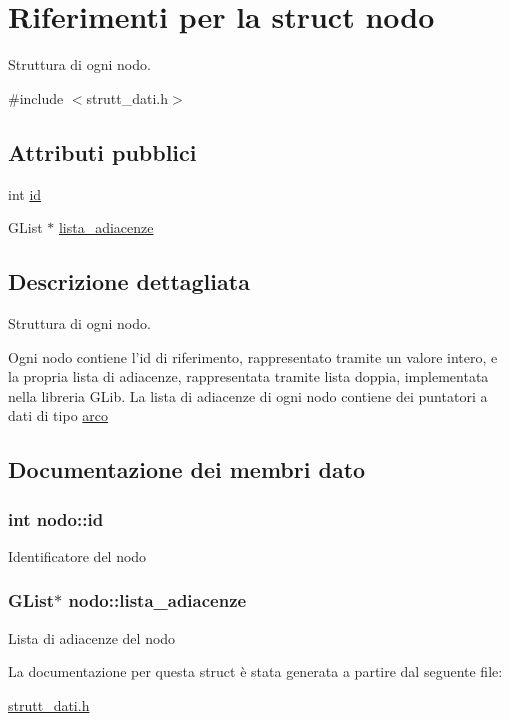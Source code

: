 \hypertarget{structnodo}{\section{Riferimenti per la struct nodo}
\label{structnodo}
}


Struttura di ogni nodo.  




{\ttfamily \#include $<$strutt\-\_\-dati.\-h$>$}

\subsection*{Attributi pubblici}
\begin{DoxyCompactItemize}
\item 
int \hyperlink{structnodo_ab666271a6c7a11224dff5d682f5b0473}{id}
\item 
G\-List $\ast$ \hyperlink{structnodo_a94b362e3d649f0289bbd3200d127e269}{lista\-\_\-adiacenze}
\end{DoxyCompactItemize}


\subsection{Descrizione dettagliata}
Struttura di ogni nodo. 

Ogni nodo contiene l'id di riferimento, rappresentato tramite un valore intero, e la propria lista di adiacenze, rappresentata tramite lista doppia, implementata nella libreria G\-Lib. La lista di adiacenze di ogni nodo contiene dei puntatori a dati di tipo \hyperlink{structarco}{arco} 

\subsection{Documentazione dei membri dato}
\hypertarget{structnodo_ab666271a6c7a11224dff5d682f5b0473}{
\subsubsection[{id}]{\setlength{\rightskip}{0pt plus 5cm}int nodo\-::id}}\label{structnodo_ab666271a6c7a11224dff5d682f5b0473}
Identificatore del nodo \hypertarget{structnodo_a94b362e3d649f0289bbd3200d127e269}{
\subsubsection[{lista\-\_\-adiacenze}]{\setlength{\rightskip}{0pt plus 5cm}G\-List$\ast$ nodo\-::lista\-\_\-adiacenze}}\label{structnodo_a94b362e3d649f0289bbd3200d127e269}
Lista di adiacenze del nodo 

La documentazione per questa struct è stata generata a partire dal seguente file\-:\begin{DoxyCompactItemize}
\item 
\hyperlink{strutt__dati_8h}{strutt\-\_\-dati.\-h}\end{DoxyCompactItemize}
